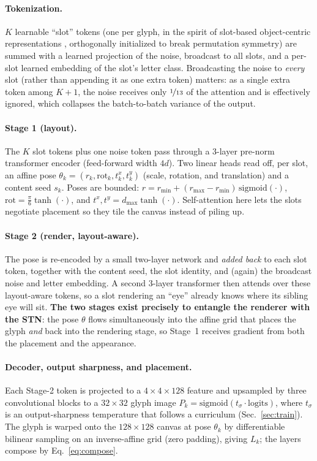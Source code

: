 \documentclass{article}
\begin{document}
\paragraph{Tokenization.} $K$ learnable ``slot'' tokens (one per glyph, in the spirit of slot-based
object-centric representations \citep{locatello2020slot}, orthogonally initialized to break permutation
symmetry) are summed with a learned projection of the noise, broadcast to all slots,
and a per-slot learned embedding of the slot's letter class. Broadcasting the noise to \emph{every}
slot (rather than appending it as one extra token) matters: as a single extra token among $K{+}1$, the
noise receives only $\nicefrac{1}{13}$ of the attention and is effectively ignored, which collapses the
batch-to-batch variance of the output.

\paragraph{Stage 1 (layout).} The $K$ slot tokens plus one noise token pass through a $3$-layer pre-norm
transformer encoder \citep{vaswani2017attention} (feed-forward width $4d$). Two linear heads read off, per slot, an affine pose
$\theta_k=(r_k,\mathrm{rot}_k,t^x_k,t^y_k)$ (scale, rotation, and translation) and a content seed
$s_k$. Poses are bounded: $r=r_{\min}+(r_{\max}-r_{\min})\,\mathrm{sigmoid}(\cdot)$,
$\mathrm{rot}=\tfrac{\pi}{6}\tanh(\cdot)$, and $t^{x},t^{y}=d_{\max}\tanh(\cdot)$. Self-attention here
lets the slots negotiate placement so they tile the canvas instead of piling up.

\paragraph{Stage 2 (render, layout-aware).} The pose is re-encoded by a small two-layer network and
\emph{added back} to each slot token, together with the content seed, the slot identity, and (again)
the broadcast noise and letter embedding. A second $3$-layer transformer then attends over these
layout-aware tokens, so a slot rendering an ``eye'' already knows where its sibling eye will sit.
\textbf{The two stages exist precisely to entangle the renderer with the STN}: the pose $\theta$ flows
simultaneously into the affine grid that places the glyph \emph{and} back into the rendering stage, so
Stage~1 receives gradient from both the placement and the appearance.

\paragraph{Decoder, output sharpness, and placement.} Each Stage-2 token is projected to a
$4{\times}4{\times}128$ feature and upsampled by three convolutional blocks to a $32{\times}32$ glyph
image $P_k=\mathrm{sigmoid}(t_\sigma\cdot\text{logits})$, where $t_\sigma$ is an output-sharpness
temperature that follows a curriculum (Sec.~\ref{sec:train}). The glyph is warped onto the
$128{\times}128$ canvas at pose $\theta_k$ by differentiable bilinear sampling on an inverse-affine
grid (zero padding), giving $L_k$; the layers compose by Eq.~\ref{eq:compose}.
\end{document}
